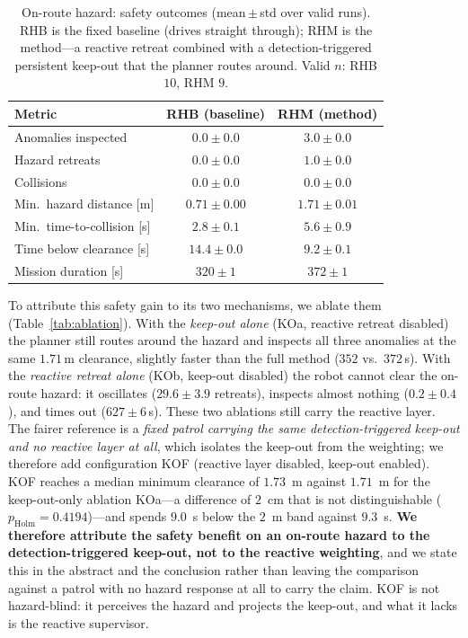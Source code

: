 \begin{table}[t]
\centering
\caption{On-route hazard: safety outcomes (mean\,$\pm$\,std over valid runs). RHB
is the fixed baseline (drives straight through); RHM is the method---a reactive
retreat combined with a detection-triggered persistent keep-out that the planner
routes around. Valid $n$: RHB $10$, RHM $9$.}
\label{tab:safety}
\footnotesize
\begin{tabular}{lcc}
\hline
\textbf{Metric} & \textbf{RHB (baseline)} & \textbf{RHM (method)}\\
\hline
Anomalies inspected        & $0.0\pm0.0$   & $3.0\pm0.0$\\
Hazard retreats            & $0.0\pm0.0$   & $1.0\pm0.0$\\
Collisions                 & $0.0\pm0.0$   & $0.0\pm0.0$\\
Min.\ hazard distance [m]  & $0.71\pm0.00$ & $1.71\pm0.01$\\
Min.\ time-to-collision [s]& $2.8\pm0.1$   & $5.6\pm0.9$\\
Time below clearance [s]   & $14.4\pm0.0$  & $9.2\pm0.1$\\
Mission duration [s]       & $320\pm1$     & $372\pm1$\\
\hline
\end{tabular}
\end{table}

To attribute this safety gain to its two mechanisms, we ablate them
(Table~\ref{tab:ablation}). With the \emph{keep-out alone} (KOa, reactive retreat
disabled) the planner still routes around the hazard and inspects all three
anomalies at the same $1.71$\,m clearance, slightly faster than the full method
($352$ vs.\ $372$\,s). With the \emph{reactive retreat alone} (KOb, keep-out
disabled) the robot cannot clear the on-route hazard: it oscillates
($29.6\pm3.9$ retreats), inspects almost nothing ($0.2\pm0.4$), and times out
($627\pm6$\,s). %
These two ablations still carry the reactive layer. The fairer reference is a
\emph{fixed patrol carrying the same detection-triggered keep-out and no reactive
layer at all}, which isolates the keep-out from the weighting; we therefore add
configuration KOF (reactive layer disabled, keep-out enabled). KOF reaches a median minimum clearance of $1.73$~m
against $1.71$~m for the keep-out-only ablation KOa---a difference of $2$~cm that is
not distinguishable ($p_{\mathrm{Holm}}=0.4194$)---and spends $9.0$~s below the $2$~m
band against $9.3$~s. \textbf{We therefore attribute the safety benefit on an on-route
hazard to the detection-triggered keep-out, not to the reactive weighting}, and we
state this in the abstract and the conclusion rather than leaving the comparison
against a patrol with no hazard response at all to carry the claim. KOF is not
hazard-blind: it perceives the hazard and projects the keep-out, and what it lacks
is the reactive supervisor.

